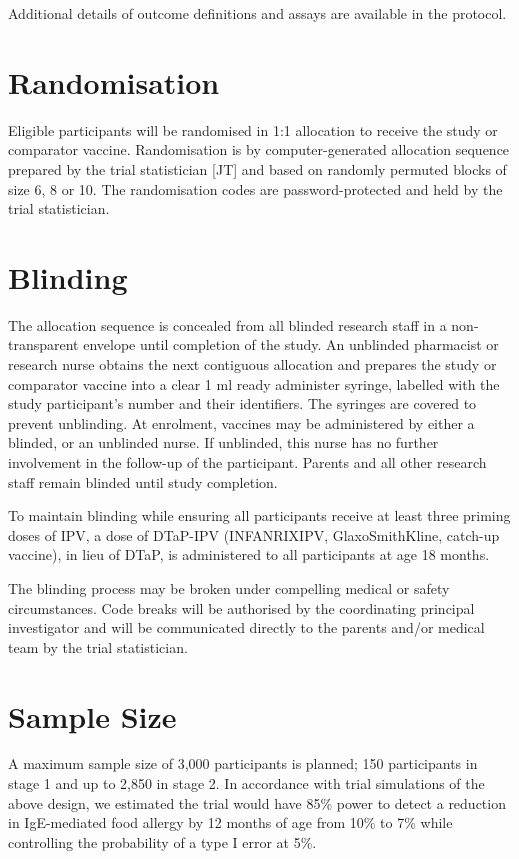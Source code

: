 \documentclass{bmcart}
\begin{document}
Additional details of outcome definitions and assays are available in the protocol.

\section*{Randomisation}

Eligible participants will be randomised in 1:1 allocation to receive the study or comparator vaccine.
Randomisation is by computer-generated allocation sequence prepared by the trial statistician [JT] and based on randomly permuted blocks of size 6, 8 or 10.
The randomisation codes are password-protected and held by the trial statistician.

\section*{Blinding}

The allocation sequence is concealed from all blinded research staff in a non-transparent envelope until completion of the study.
An unblinded pharmacist or research nurse obtains the next contiguous allocation and prepares the study or comparator vaccine into a clear 1 ml ready administer syringe, labelled with the study participant's number and their identifiers.
The syringes are covered to prevent unblinding.
At enrolment, vaccines may be administered by either a blinded, or an unblinded nurse.
If unblinded, this nurse has no further involvement in the follow-up of the participant.
Parents and all other research staff remain blinded until study completion.

To maintain blinding while ensuring all participants receive at least three priming doses of IPV, a dose of DTaP-IPV (INFANRIX\textregistered IPV, GlaxoSmithKline, catch-up vaccine), in lieu of DTaP, is administered to all participants at age 18 months.

The blinding process may be broken under compelling medical or safety circumstances. 
Code breaks will be authorised by the coordinating principal investigator and will be communicated directly to the parents and/or medical team by the trial statistician.

\section*{Sample Size}

A maximum sample size of 3,000 participants is planned; 150 participants in stage 1 and up to 2,850 in stage 2.
In accordance with trial simulations of the above design, we estimated the trial would have 85\% power to detect a reduction in IgE-mediated food allergy by 12 months of age from 10\% to 7\% while controlling the probability of a type I error at 5\%.
\end{document}
